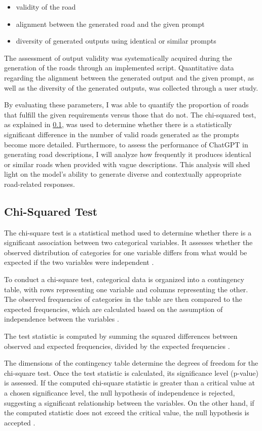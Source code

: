 \begin{itemize}
	\item validity of the road
	\item alignment between the generated road and the given prompt
	\item diversity of generated outputs using identical or similar prompts
\end{itemize}

The assessment of output validity was systematically acquired during the generation of the roads through an implemented script. Quantitative data regarding the alignment between the generated output and the given prompt, as well as the diversity of the generated outputs, was collected through a user study.

By evaluating these parameters, I was able to quantify the proportion of roads that fulfill the given requirements versus those that do not. The chi-squared test, as explained in \ref{chi-squared}, was used to determine whether there is a statistically significant difference in the number of valid roads generated as the prompts become more detailed. 
Furthermore, to assess the performance of ChatGPT in generating road descriptions, I will analyze how frequently it produces identical or similar roads when provided with vague descriptions. This analysis will shed light on the model’s ability to generate diverse and contextually appropriate road-related responses.

\subsection{Chi-Squared Test} \label{chi-squared}
The chi-square test is a statistical method used to determine whether there is a significant association between two categorical variables. It assesses whether the observed distribution of categories for one variable differs from what would be expected if the two variables were independent \cite{Freedman_2007}.

To conduct a chi-square test, categorical data is organized into a contingency table, with rows representing one variable and columns representing the other. The observed frequencies of categories in the table are then compared to the expected frequencies, which are calculated based on the assumption of independence between the variables \cite{Freedman_2007}.

The test statistic is computed by summing the squared differences between observed and expected frequencies, divided by the expected frequencies \cite{Freedman_2007}. 

The dimensions of the contingency table determine the degrees of freedom for the chi-square test. Once the test statistic is calculated, its significance level (p-value) is assessed. If the computed chi-square statistic is greater than a critical value at a chosen significance level, the null hypothesis of independence is rejected, suggesting a significant relationship between the variables. On the other hand, if the computed statistic does not exceed the critical value, the null hypothesis is accepted \cite{Freedman_2007}.
